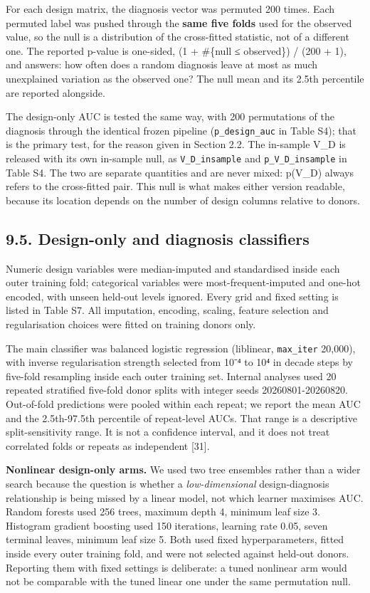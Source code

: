 For each design matrix, the diagnosis vector was permuted 200 times. Each permuted label was pushed through the \textbf{same five folds} used for the observed value, so the null is a distribution of the cross-fitted statistic, not of a different one. The reported p-value is one-sided, (1 + \#\{null ≤ observed\}) / (200 + 1), and answers: how often does a random diagnosis leave at most as much unexplained variation as the observed one? The null mean and its 2.5th percentile are reported alongside.

The design-only AUC is tested the same way, with 200 permutations of the diagnosis through the identical frozen pipeline (\texttt{p\_design\_auc} in Table S4); that is the primary test, for the reason given in Section 2.2. The in-sample V\_D is released with its own in-sample null, as \texttt{V\_D\_insample} and \texttt{p\_V\_D\_insample} in Table S4. The two are separate quantities and are never mixed: p(V\_D) always refers to the cross-fitted pair. This null is what makes either version readable, because its location depends on the number of design columns relative to donors.

\subsection{9.5. Design-only and diagnosis classifiers}\label{design-only-and-diagnosis-classifiers}

Numeric design variables were median-imputed and standardised inside each outer training fold; categorical variables were most-frequent-imputed and one-hot encoded, with unseen held-out levels ignored. Every grid and fixed setting is listed in Table S7. All imputation, encoding, scaling, feature selection and regularisation choices were fitted on training donors only.

The main classifier was balanced logistic regression (liblinear, \texttt{max\_iter} 20,000), with inverse regularisation strength selected from 10⁻⁴ to 10⁴ in decade steps by five-fold resampling inside each outer training set. Internal analyses used 20 repeated stratified five-fold donor splits with integer seeds 20260801-20260820. Out-of-fold predictions were pooled within each repeat; we report the mean AUC and the 2.5th-97.5th percentile of repeat-level AUCs. That range is a descriptive split-sensitivity range. It is not a confidence interval, and it does not treat correlated folds or repeats as independent {[}31{]}.

\textbf{Nonlinear design-only arms.} We used two tree ensembles rather than a wider search because the question is whether a \emph{low-dimensional} design-diagnosis relationship is being missed by a linear model, not which learner maximises AUC. Random forests used 256 trees, maximum depth 4, minimum leaf size 3. Histogram gradient boosting used 150 iterations, learning rate 0.05, seven terminal leaves, minimum leaf size 5. Both used fixed hyperparameters, fitted inside every outer training fold, and were not selected against held-out donors. Reporting them with fixed settings is deliberate: a tuned nonlinear arm would not be comparable with the tuned linear one under the same permutation null.

